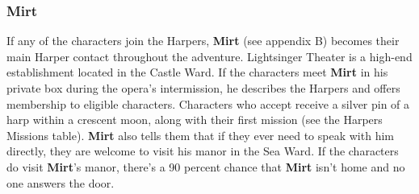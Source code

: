 \documentclass[10pt,a4paper,twoside,twocolumn,openany,nodeprecatedcode]{dndbook}
\begin{document}
\subsubsection{Mirt}
If any of the characters join the Harpers, \textbf{Mirt} (see appendix B) becomes their main Harper contact throughout the adventure.
Lightsinger Theater is a high-end establishment located in the Castle Ward. If the characters meet \textbf{Mirt} in his private box during the opera's intermission, he describes the Harpers and offers membership to eligible characters. Characters who accept receive a silver pin of a harp within a crescent moon, along with their first mission (see the Harpers Missions table). \textbf{Mirt} also tells them that if they ever need to speak with him directly, they are welcome to visit his manor in the Sea Ward. If the characters do visit \textbf{Mirt}'s manor, there's a 90 percent chance that \textbf{Mirt} isn't home and no one answers the door.
\end{document}
